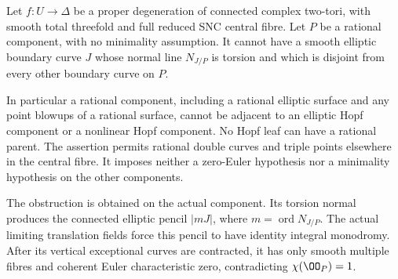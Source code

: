
\begin{proposition}\label{cdp:st:C.2.UN.67}
Let \(f:U\to\Delta\) be a proper degeneration of connected
complex two-tori, with smooth total threefold and full
reduced SNC central fibre. Let \(P\) be a rational
component, with no minimality assumption. It cannot
have a smooth elliptic boundary curve \(J\) whose normal
line \(N_{J/P}\) is torsion and which is disjoint from
every other boundary curve on \(P\).

In particular a rational component, including a rational
elliptic surface and any point blowups of a rational
surface, cannot be adjacent to an elliptic Hopf component
or a nonlinear Hopf component. No Hopf leaf can have a
rational parent. The assertion permits rational double
curves and triple points elsewhere in the central fibre.
It imposes neither a zero-Euler hypothesis nor a
minimality hypothesis on the other components.

The obstruction is obtained on the actual component.
Its torsion normal produces the connected elliptic
pencil \(|mJ|\), where \(m=\operatorname{ord}N_{J/P}\).
The actual limiting translation fields force this
pencil to have identity integral monodromy. After its
vertical exceptional curves are contracted, it has
only smooth multiple fibres and coherent Euler
characteristic zero, contradicting
\(\chi(\OO_P)=1\).
\end{proposition}

